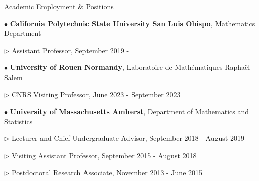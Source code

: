 \documentclass[10pt]{article} %
\newenvironment{outerlist}[1][\enskip\textbullet]%
        {\begin{itemize}[#1]}{\end{itemize}%
         \vspace{-.6\baselineskip}}
\newenvironment{innerlist}[1][\enskip\textbullet]%
        {\begin{compactitem}[#1]}{\end{compactitem}}
\begin{document}
\begin{section}{Academic Employment \& Positions}
\vspace{-6.9mm}
\begin{outerlist}
\item[$\bullet$]
\textbf{California Polytechnic State University San Luis Obispo}, Mathematics Department
\begin{innerlist}
\item [$\triangleright$] Assistant Professor, September 2019 -
\end{innerlist}
\item[$\bullet$]
\textbf{University of Rouen Normandy}, Laboratoire de Math\'ematiques Rapha\"el Salem
\begin{innerlist}
\item [$\triangleright$] CNRS Visiting Professor, June 2023 - September 2023
\end{innerlist}
\item[$\bullet$]
\textbf{University of Massachusetts Amherst}, Department of
Mathematics and Statistics
\begin{innerlist}
\item [$\triangleright$] Lecturer and Chief Undergraduate Advisor, September 2018 - August 2019
\item [$\triangleright$] Visiting Assistant Professor, September 2015 - August 2018
\item [$\triangleright$] Postdoctoral Research Associate, November 2013 - June 2015
\end{innerlist}

\end{outerlist}
\end{section}
\end{document}
